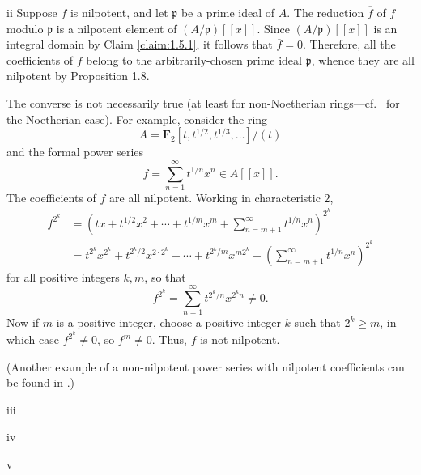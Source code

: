 \begin{partsolution}{1}{5}{ii}
Suppose \(f\) is nilpotent, and let \(\mathfrak p\) be a prime ideal of \(A\).
The reduction \(\overline f\) of \(f\) modulo \(\mathfrak p\) is a nilpotent element of \((A/\mathfrak p)[[x]]\).
Since \((A/\mathfrak p)[[x]]\) is an integral domain by Claim \ref{claim:1.5.1}, it follows that \(\overline f = 0\).
Therefore, all the coefficients of \(f\) belong to the arbitrarily-chosen prime ideal \(\mathfrak p\), whence they are all nilpotent by Proposition 1.8.

The converse is not necessarily true (at least for non-Noetherian rings---cf.~ for the Noetherian case).
For example, consider the ring
\begin{equation*}
A = \mathbf{F}_2[t, t^{1/2}, t^{1/3}, \ldots]/(t)
\end{equation*}
and the formal power series
\begin{equation*}
f = \sum_{n=1}^\infty t^{1/n} x^n \in A[[x]].
\end{equation*}
The coefficients of \(f\) are all nilpotent.
Working in characteristic \(2\),
\begin{align*}
f^{2^k}
&= \left(t x + t^{1/2} x^2 + \cdots + t^{1/m} x^m + \sum_{n = m + 1}^\infty t^{1/n} x^n\right)^{2^k}
\\&= t^{2^k} x^{2^k} + t^{2^k / 2} x^{2\cdot2^k} + \cdots + t^{2^k / m} x^{m 2^k} + \left(\sum_{n = m+1}^\infty t^{1/n} x^n\right)^{2^k}
\end{align*}
for all positive integers \(k, m\), so that
\begin{equation*}
f^{2^k}
= \sum_{n=1}^\infty t^{2^k/n} x^{2^k n} \neq 0.
\end{equation*}
Now if \(m\) is a positive integer, choose a positive integer \(k\) such that \(2^k \geq m\), in which case \(f^{2^k} \neq 0\), so \(f^m \neq 0\).
Thus, \(f\) is not nilpotent.

(Another example of a non-nilpotent power series with nilpotent coefficients can be found in \cite[Example 2]{FieldsZeroDivisors}.)
\end{partsolution}

\begin{partsolution}{1}{5}{iii}

\end{partsolution}

\begin{partsolution}{1}{5}{iv}

\end{partsolution}

\begin{partsolution}{1}{5}{v}

\end{partsolution}